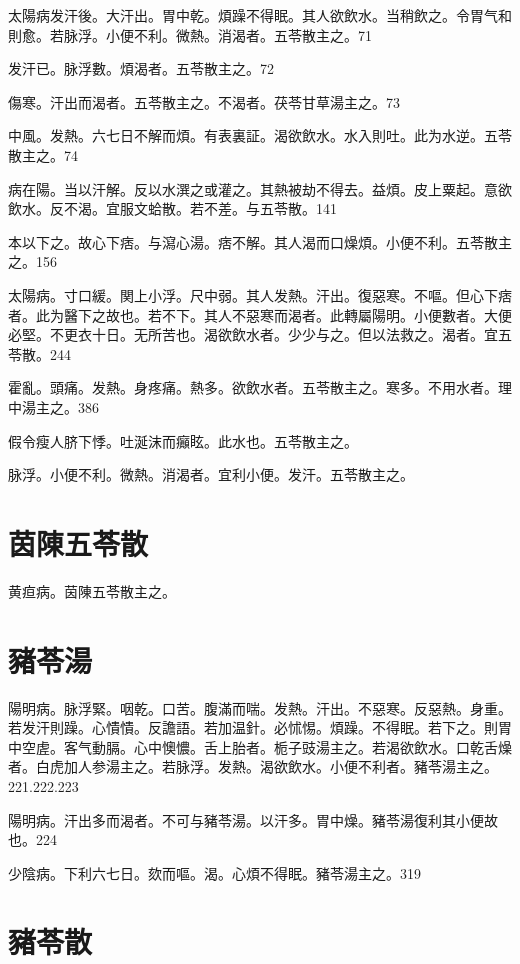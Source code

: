 太陽病发汗後。大汗出。胃中乾。煩躁不得眠。其人欲飲水。当稍飲之。令胃气和則愈。若脉浮。小便不利。微熱。消渴者。五苓散主之。71

发汗已。脉浮數。煩渴者。五苓散主之。72

傷寒。汗出而渴者。五苓散主之。不渴者。茯苓甘草湯主之。73

中風。发熱。六七日不解而煩。有表裏証。渴欲飲水。水入則吐。此为水逆。五苓散主之。74

病在陽。当以汗解。反以水潠之或灌之。其熱被劫不得去。益煩。皮上粟起。意欲飲水。反不渴。宜服文蛤散。若不差。与五苓散。141

本以下之。故心下痞。与瀉心湯。痞不解。其人渴而口燥{\khaaitp 煩}。小便不利。五苓散主之。156

太陽病。寸{\khaaitp 口}緩。関{\khaaitp 上小}浮。尺{\khaaitp 中}弱。其人发熱。汗出。復惡寒。不嘔。但心下痞者。此为醫下之故也。若不下。其人不惡寒而渴者。此轉屬陽明。小便數者。大便必堅。不更衣十日。无所苦也。{\khaaitp 渴}欲飲水者。少少与之。但以法救之。渴者。宜五苓散。244

霍亂。頭痛。发熱。身疼痛。熱多。欲飲水者。五苓散主之。寒多。不用水者。理中湯主之。386

假令瘦人脐下悸。吐涎沫而癲眩。{\khaaitp 此}水也。五苓散主之。

脉浮。小便不利。微熱。消渴者。宜利小便。发汗。五苓散主之。

\section{茵陳五苓散}

黄疸病。茵陳五苓散主之。

\section{豬苓湯}

陽明病。脉浮緊。咽乾。口苦。腹滿而喘。发熱。汗出。不惡寒。反惡熱。身重。若发汗則躁。心憒憒。反譫語。若加温針。必怵惕。煩躁。不得眠。若下之。則胃中空虗。客气動膈。心中懊憹。舌上胎者。栀子{\khaaitp 豉}湯主之。若渴欲飲水。口乾舌燥者。白虎{\khaaitp 加人参}湯主之。若脉浮。发熱。渴欲飲水。小便不利者。豬苓湯主之。221.222.223

陽明病。汗出多而渴者。不可与豬苓湯。以汗多。胃中燥。豬苓湯復利其小便故也。224

少陰病。下利六七日。欬而嘔。渴。心煩不得眠。豬苓湯主之。319

\section{豬苓散}

